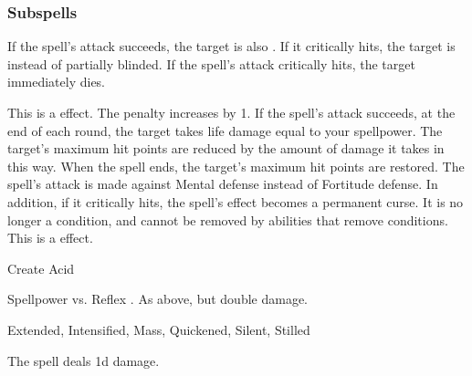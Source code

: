 \subsubsection{Subspells}
If the spell's attack succeeds, the target is also \partiallyblinded. If it critically hits, the target is \blinded instead of partially blinded.
If the spell's attack critically hits, the target immediately dies.
\par
This is a  effect.
The penalty increases by 1.
If the spell's attack succeeds, at the end of each round, the target takes life damage equal to your spellpower.
The target's maximum hit points are reduced by the amount of damage it takes in this way.
When the spell ends, the target's maximum hit points are restored.
The spell's attack is made against Mental defense instead of Fortitude defense.
In addition, if it critically hits, the spell's effect becomes a permanent curse.
It is no longer a condition, and cannot be removed by abilities that remove conditions.
This is a  effect.
\begin{spellsection}{Create Acid}
\begin{spellheader}
\end{spellheader}
\begin{spellcontent}
\begin{spelltargetinginfo}
\end{spelltargetinginfo}
\begin{spelleffects}
\begin{spellattack}{Spellpower vs. Reflex}
\spellsuccess {}.
\spellcritical As above, but double damage.
\end{spellattack}
\end{spelleffects}
\end{spellcontent}
\begin{spellfooter}
 Extended, Intensified, Mass, Quickened, Silent, Stilled
\end{spellfooter}
\begin{spellsubcontent}
\begin{spellcantrip}
The spell deals \minus1d damage.
\end{spellcantrip}
\end{spellsubcontent}
\end{spellsection}
